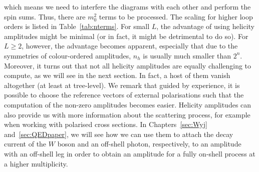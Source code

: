 \documentclass[main.tex]{subfiles}
\begin{document}
which means we need to interfere the diagrams with each other and perform the spin sums. Thus, there are $m_0^2$ terms to be processed. The scaling for higher loop orders is listed in Table~\ref{tab:nterms}. For small $L$, the advantage of using helicity amplitudes might be minimal (or in fact, it might be detrimental to do so). For $L\geq2$, however, the advantage becomes apparent, especially that due to the symmetries of colour-ordered amplitudes, $n_h$ is usually much smaller than $2^n$. Moreover, it turns out that not all helicity amplitudes are equally challenging to compute, as we will see in the next section. In fact, a host of them vanish altogether (at least at tree-level). We remark that guided by experience, it is possible to choose the reference vectors of external polarisations such that the computation of the non-zero amplitudes becomes easier. Helicity amplitudes can also provide us with more information about the scattering process, for example when working with polarised cross sections. In Chapters~\ref{sec:Wyj} and~\ref{sec:QEDpaper}, we will see how we can use them to attach the decay current of the $W$ boson and an off-shell photon, respectively, to an amplitude with an off-shell leg in order to obtain an amplitude for a fully on-shell process at a higher multiplicity.
\end{document}
